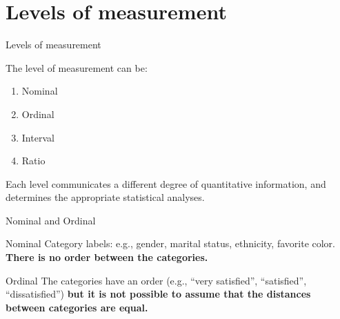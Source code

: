 \documentclass{beamer}
\begin{document}
\section{Levels of measurement}
\begin{frame}{Levels of measurement}
  \begin{block}{The level of measurement can be:}
    \begin{enumerate}
      \item Nominal
      \item Ordinal
      \item Interval
      \item Ratio
    \end{enumerate}
 \end{block}
Each level communicates a different degree of quantitative information, and determines the appropriate statistical analyses.
\end{frame}

\begin{frame}{Nominal and Ordinal}
\begin{block}{Nominal}
    Category labels: e.g., gender, marital status, ethnicity, favorite color. \textbf{There is no order between the categories.}
\end{block}
\pause
\begin{block}{Ordinal}
    The categories have an order (e.g., “very satisfied”, “satisfied”, “dissatisfied”) \textbf{but it is not possible to assume that the distances between categories are equal.} \\
    \pause
    \centering
    \vspace{0.5em}
\end{block}
\end{frame}
\end{document}

